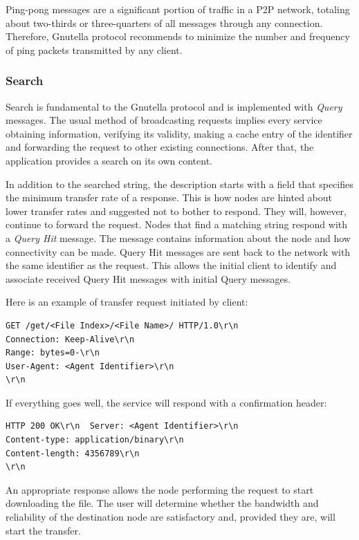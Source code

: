 Ping-pong messages are a significant portion of traffic in a P2P network,
totaling about two-thirds or three-quarters of all messages through any
connection. Therefore, Gnutella protocol recommends to minimize the number
and frequency of ping packets transmitted by any client.

\subsubsection{Search}

Search is fundamental to the Gnutella protocol and is implemented with
\textit{Query} messages. The usual method of broadcasting requests implies
every service obtaining information, verifying its validity, making a cache entry
of the identifier and forwarding the request to other existing connections. After
that, the application provides a search on its own content.

In addition to the searched string, the description starts with a field that
specifies the minimum transfer rate of a response. This is how nodes are
hinted about lower transfer rates and suggested not to bother to respond.
They will, however, continue to forward the request. Nodes that find a matching
string respond with a \textit{Query Hit} message. The message contains
information about the node and how connectivity can be made. Query Hit
messages are sent back to the network with the same identifier as the request.
This allows the initial client to identify and associate received Query Hit
messages with initial Query messages.

Here is an example of transfer request initiated by client:

\begin{verbatim}
GET /get/<File Index>/<File Name>/ HTTP/1.0\r\n
Connection: Keep-Alive\r\n
Range: bytes=0-\r\n
User-Agent: <Agent Identifier>\r\n
\r\n
\end{verbatim}

If everything goes well, the service will respond with a confirmation header:

\begin{verbatim}
HTTP 200 OK\r\n  Server: <Agent Identifier>\r\n
Content-type: application/binary\r\n
Content-length: 4356789\r\n
\r\n
\end{verbatim}

An appropriate response allows the node performing the request to start
downloading the file. The user will determine whether the bandwidth and
reliability of the destination node are satisfactory and, provided they are,
will start the transfer.


